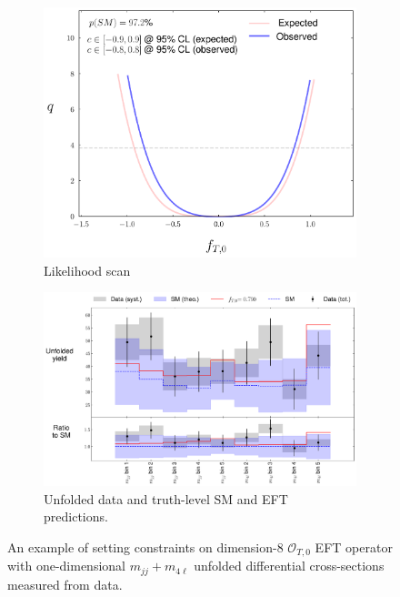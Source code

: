 \begin{figure}[!htb]
    \centering
    \begin{subfigure}{.49\textwidth}
        \centering
        \includegraphics[width=.8\linewidth]{figures/Results/EFT/Likelihood_profile_FT0_mjj_m4l_SM_fixed_twoobs.pdf}
        \caption{ Likelihood scan \label{fig:EFT_Example_LikelihoodScan_Data}}
    \end{subfigure}
    \begin{subfigure}{.49\textwidth}
        \centering
        \includegraphics[width=.99\linewidth]{figures/Results/EFT/Unfolded_spectrum_FT0_mjj_m4l_SM_fixed_twoobs.pdf}
        \caption{ Unfolded data and truth-level SM and EFT predictions.\label{fig:EFT_Example_MaxValue_Data} }
    \end{subfigure}
    \caption{ An example of setting constraints on dimension-8 $\mathcal{O}_{T,0}$ EFT operator with one-dimensional $m_{jj}+m_{4\ell}$ unfolded differential cross-sections measured from data.  \label{fig:EFT_Example_Data}}
\end{figure}

